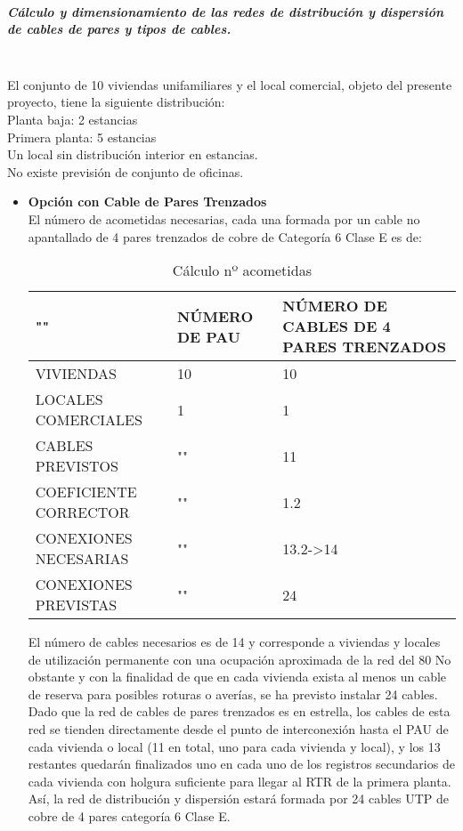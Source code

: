 \subparagraph{Cálculo y dimensionamiento de las redes de distribución y dispersión de cables de pares y tipos de cables.}\textbf{}\\
El conjunto de 10 viviendas unifamiliares y el local comercial, objeto del presente
proyecto, tiene la siguiente distribución:\\
Planta baja:		2 estancias\\
Primera planta: 	5 estancias\\
Un local sin distribución interior en estancias.\\
No existe previsión de conjunto de oficinas.
\begin{itemize}
	\item \textbf{Opción con Cable de Pares Trenzados}\\
	El número de acometidas necesarias, cada una formada por un cable no apantallado de 4 pares trenzados de cobre de Categoría 6 Clase E es de:\\
	\begin{table}[H]
\centering
\begin{tabular}{p{5cm} p{5cm} p{5cm}}
\hline
""&NÚMERO DE PAU&NÚMERO DE CABLES DE 4 PARES TRENZADOS \\
\hline \hline
VIVIENDAS&10&10\\
\hline
LOCALES COMERCIALES&1&1\\
\hline
CABLES PREVISTOS&""&11\\
\hline
COEFICIENTE CORRECTOR&""&1.2\\
\hline
CONEXIONES NECESARIAS&""&13.2->14\\
\hline
CONEXIONES PREVISTAS&""&24
\end{tabular}

\caption{Cálculo nº acometidas}
\label{tabla:autores}
\end{table}

El número de cables necesarios es de 14 y corresponde a viviendas y locales de utilización permanente con una ocupación aproximada de la red del 80%
No obstante y con la finalidad de que en cada vivienda exista al menos un cable de reserva para
posibles roturas o averías, se ha previsto instalar 24 cables.\\
Dado que la red de cables de pares trenzados es en estrella, los cables de esta red se tienden
directamente desde el punto de interconexión hasta el PAU de cada vivienda o local (11 en total,
uno para cada vivienda y local), y los 13 restantes quedarán finalizados uno en cada uno de los
registros secundarios de cada vivienda con holgura suficiente para llegar al RTR de la primera planta.\\
Así, la red de distribución y dispersión estará formada por 24 cables UTP de cobre de 4 pares categoría 6 Clase E.

\end{itemize}

